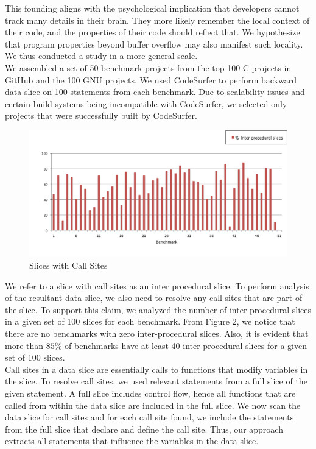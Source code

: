 \documentclass[12pt]{article}
\begin{document}
This founding aligns with the psychological implication that developers cannot track many details in their brain. They more likely remember the local context of their code, and the properties of their code should reflect that. We hypothesize that program properties beyond buffer overflow may also manifest such locality. We thus conducted a study in a more general scale.\\

We assembled a set of 50 benchmark projects from the top 100 C projects
in GitHub and the 100 GNU projects. We used CodeSurfer to perform backward
data slice on 100 statements from each benchmark. Due to scalability
issues and certain build systems being incompatible with CodeSurfer, we selected only projects that were successfully built by CodeSurfer.\\

\begin{figure}[H]
     \centering
     \includegraphics[width=5in]{Inter-procedural-slices.png}
     \caption{Slices with Call Sites}
     \label{interprocedural slices}
 \end{figure}

We refer to a slice with call sites as an inter procedural slice. To perform analysis of the resultant data slice, we also need to resolve any call sites that are part of the slice. To support this claim, we analyzed the number of inter procedural slices in a given set of 100 slices for each benchmark. From Figure 2, we notice that there are no benchmarks with zero inter-procedural slices. Also, it is evident that more than $85\%$ of benchmarks have at least 40 inter-procedural slices for a given set of 100 slices. \\


Call sites in a data slice are essentially calls to functions that modify variables in the slice. To resolve call sites, we used relevant statements from a full slice of the given statement. A full slice includes control flow, hence all functions that are called from within the data slice are included in the full slice. We now scan the data slice for call sites and for each call site found, we include the statements from the full slice that declare and define the call site. Thus, our approach extracts all statements that influence the variables in the data slice.\\
\end{document}

